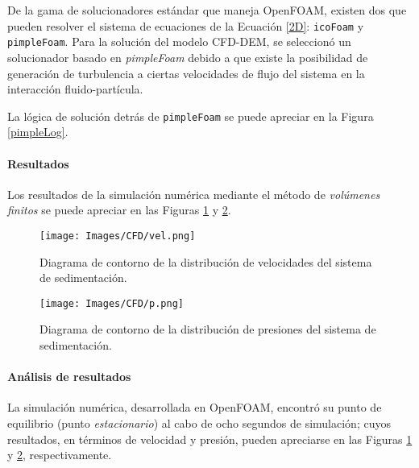 \noindent
\justify

De la gama de solucionadores est\'andar que maneja OpenFOAM, existen dos que pueden resolver el sistema de ecuaciones de la Ecuaci\'on \ref{2D}: \texttt{icoFoam} y \texttt{pimpleFoam}. Para la soluci\'on del modelo CFD-DEM, se seleccion\'o un solucionador basado en \textit{pimpleFoam} debido a que existe la posibilidad de generaci\'on de turbulencia a ciertas velocidades de flujo del sistema en la interacci\'on fluido-part\'icula.

\noindent
\justify

La l\'ogica de soluci\'on detr\'as de \texttt{pimpleFoam} se puede apreciar en la Figura \ref{pimpleLog}.



\newpage

\paragraph{Resultados} \label{CFD:resultados}

\noindent
\justify

Los resultados de la simulaci\'on num\'erica mediante el m\'etodo de \textit{vol\'umenes finitos} se puede apreciar en las Figuras \ref{CFD:vel} y \ref{CFD:p}.

\begin{figure}[h!]
	\centering
	\texttt{[image: Images/CFD/vel.png]}
	\caption{Diagrama de contorno de la distribuci\'on de velocidades del sistema de sedimentaci\'on.}
	\label{CFD:vel}
\end{figure}

\begin{figure}[h!]
	\centering
	\texttt{[image: Images/CFD/p.png]}
	\caption{Diagrama de contorno de la distribuci\'on de presiones del sistema de sedimentaci\'on.}
	\label{CFD:p}
\end{figure}

\paragraph{An\'alisis de resultados}

\noindent
\justify

La simulaci\'on num\'erica, desarrollada en OpenFOAM, encontr\'o su punto de equilibrio (punto \textit{estacionario}) al cabo de ocho segundos de simulaci\'on; cuyos resultados, en t\'erminos de velocidad y presi\'on, pueden apreciarse en las Figuras \ref{CFD:vel} y \ref{CFD:p}, respectivamente.

